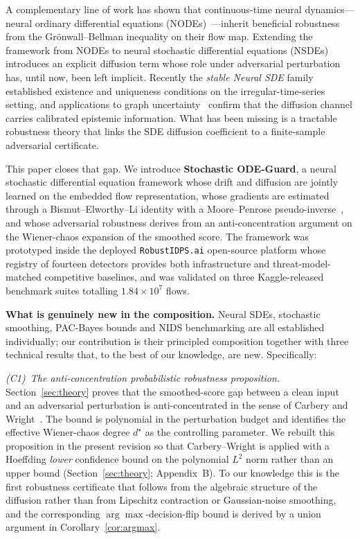 \documentclass{ieeeaccess}
\begin{document}
A complementary line of work has shown that continuous-time neural
dynamics---neural ordinary differential equations
(NODEs)~\cite{kang2021sodef,guglielmi2025minimal}---inherit beneficial
robustness from the Gr\"onwall--Bellman inequality on their flow map.
Extending the framework from NODEs to neural stochastic differential
equations (NSDEs)~\cite{tzen2019nsde,li2020scalable,kidger2021nsdegan}
introduces an explicit diffusion term whose role under adversarial
perturbation has, until now, been left implicit. Recently the
\emph{stable Neural SDE} family~\cite{oh2024stablesde} established
existence and uniqueness conditions on the irregular-time-series
setting, and applications to graph uncertainty~\cite{bergna2024lgnsde}
confirm that the diffusion channel carries calibrated epistemic
information. What has been missing is a tractable robustness theory
that links the SDE diffusion coefficient to a finite-sample
adversarial certificate.

This paper closes that gap. We introduce \textbf{Stochastic ODE-Guard},
a neural stochastic differential equation framework whose drift and
diffusion are jointly learned on the embedded flow representation,
whose gradients are estimated through a Bismut--Elworthy--Li identity
with a Moore--Penrose pseudo-inverse~\cite{bismut1981martingales,elworthy1994formulae},
and whose adversarial robustness derives from an anti-concentration
argument on the Wiener-chaos expansion of the smoothed score. The
framework was prototyped inside the deployed \texttt{RobustIDPS.ai}
open-source platform whose registry of fourteen detectors provides
both infrastructure and threat-model-matched competitive baselines,
and was validated on three Kaggle-released benchmark suites totalling
$1.84\times 10^7$ flows.

\medskip\noindent\textbf{What is genuinely new in the composition.}
Neural SDEs, stochastic smoothing, PAC-Bayes bounds and NIDS
benchmarking are all established individually; our contribution is
their principled composition together with three technical results
that, to the best of our knowledge, are new. Specifically:

\emph{(C1)~The anti-concentration probabilistic robustness proposition.}
Section~\ref{sec:theory} proves that the smoothed-score gap between a
clean input and an adversarial perturbation is anti-concentrated in
the sense of Carbery and Wright~\cite{carbery2001anticonc}. The bound
is polynomial in the perturbation budget and identifies the effective
Wiener-chaos degree $d^\star$ as the controlling parameter. We
rebuilt this proposition in the present revision so that
Carbery--Wright is applied with a Hoeffding \emph{lower} confidence
bound on the polynomial $L^{2}$ norm rather than an upper bound
(Section~\ref{sec:theory}; Appendix~B). To our knowledge this is the
first robustness certificate that follows from the algebraic structure
of the diffusion rather than from Lipschitz contraction or
Gaussian-noise smoothing, and the corresponding
$\arg\max$-decision-flip bound is derived by a union argument in
Corollary~\ref{cor:argmax}.
\end{document}
